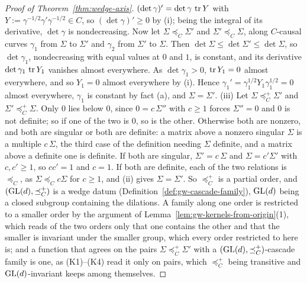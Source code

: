\begin{proof}[Proof of Theorem~\ref{thm:wedge-axis}]
$(\det\gamma)' = \det\gamma\,\operatorname{tr} Y$ with $Y := \gamma^{-1/2}\gamma'\gamma^{-1/2} \in C$, so $(\det\gamma)' \ge 0$
by (i); being the integral of its derivative, $\det\gamma$ is nondecreasing. Now let $\Sigma \preceq_C \Sigma'$
and $\Sigma' \preceq_C \Sigma$, along $C$-causal curves $\gamma_1$ from $\Sigma$ to $\Sigma'$ and $\gamma_2$ from
$\Sigma'$ to $\Sigma$. Then $\det\Sigma \le \det\Sigma' \le \det\Sigma$, so $\det\gamma_1$, nondecreasing with
equal values at $0$ and $1$, is constant, and its derivative $\det\gamma_1\,\operatorname{tr} Y_1$ vanishes almost
everywhere. As $\det\gamma_1 > 0$, $\operatorname{tr} Y_1 = 0$ almost everywhere, and so $Y_1 = 0$ almost everywhere by (i).
Hence $\gamma_1' = \gamma_1^{1/2}Y_1\gamma_1^{1/2} = 0$ almost everywhere, $\gamma_1$ is constant by fact (a),
and $\Sigma = \Sigma'$. (iii) Let $\Sigma \preceq^+_C \Sigma'$ and $\Sigma' \preceq^+_C \Sigma$. Only $0$ lies
below $0$, since $0 = c\,\Sigma''$ with $c \ge 1$ forces $\Sigma'' = 0$ and $0$ is not definite; so if one of
the two is $0$, so is the other. Otherwise both are nonzero, and both are singular or both are definite:
a matrix above a nonzero singular $\Sigma$ is a multiple $c\,\Sigma$, the third case of the definition
needing $\Sigma$ definite, and a matrix above a definite one is definite. If both are singular,
$\Sigma' = c\,\Sigma$ and $\Sigma = c'\Sigma'$ with $c, c' \ge 1$, so $cc' = 1$ and $c = 1$. If both are
definite, each of the two relations is $\preceq_C$, as $\Sigma \preceq_C c\Sigma$ for $c \ge 1$, and (ii) gives
$\Sigma = \Sigma'$. So $\preceq^+_C$ is a partial order, and $(\mathrm{GL}(d), \preceq^+_C)$ is a wedge datum
(Definition~\ref{def:gw-cascade-family}), $\mathrm{GL}(d)$ being a closed subgroup containing the dilations. A family along one
order is restricted to a smaller order by the argument of Lemma~\ref{lem:gw-kernels-from-origin}(1), which reads
of the two orders only that one contains the other and that the smaller is invariant under the smaller
group, which every order restricted to here is; and a function that agrees on the pairs
$\Sigma \preceq^+_C \Sigma'$ with a $(\mathrm{GL}(d), \preceq^+_C)$-cascade family is one, as (K1)--(K4) read it only
on pairs, which $\preceq^+_C$ being transitive and $\mathrm{GL}(d)$-invariant keeps among themselves.


\end{proof}
